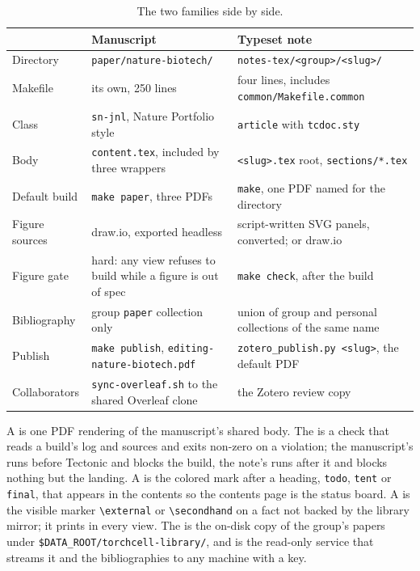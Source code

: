 \begin{table}[htbp]
\centering
\footnotesize
\caption{The two families side by side.}
\label{tab:families}
\begin{tabular}{lp{}p{}}
\toprule
 & Manuscript & Typeset note \\
\midrule
Directory & \texttt{paper/nature-biotech/} & \texttt{notes-tex/<group>/<slug>/} \\
Makefile & its own, 250 lines & four lines, includes \texttt{common/Makefile.common} \\
Class & \texttt{sn-jnl}, Nature Portfolio style & \texttt{article} with \texttt{tcdoc.sty} \\
Body & \texttt{content.tex}, included by three wrappers & \texttt{<slug>.tex} root, \texttt{sections/*.tex} \\
Default build & \texttt{make paper}, three PDFs & \texttt{make}, one PDF named for the directory \\
Figure sources & draw.io, exported headless & script-written SVG panels, converted; or draw.io \\
Figure gate & hard: any view refuses to build while a figure is out of spec & \texttt{make check}, after the build \\
Bibliography & group \texttt{paper} collection only & union of group and personal collections of the same name \\
Publish & \texttt{make publish}, \texttt{editing-nature-biotech.pdf} & \texttt{zotero\_publish.py <slug>}, the default PDF \\
Collaborators & \texttt{sync-overleaf.sh} to the shared Overleaf clone & the Zotero review copy \\
\bottomrule
\end{tabular}
\end{table}

A  is one PDF rendering of the manuscript's shared body. The
 is a check that reads a build's log and sources and exits non-zero on
a violation; the manuscript's runs before Tectonic and blocks the build, the note's
runs after it and blocks nothing but the landing. A  is the
colored mark after a heading, \texttt{todo}, \texttt{tent} or \texttt{final}, that
appears in the contents so the contents page is the status board. A
 is the visible marker \texttt{\textbackslash external} or
\texttt{\textbackslash secondhand} on a fact not backed by the library mirror; it
prints in every view. The  is the on-disk copy of the group's papers
under \texttt{\$DATA\_ROOT/torchcell-library/}, and  is the read-only
service that streams it and the bibliographies to any machine with a key.
